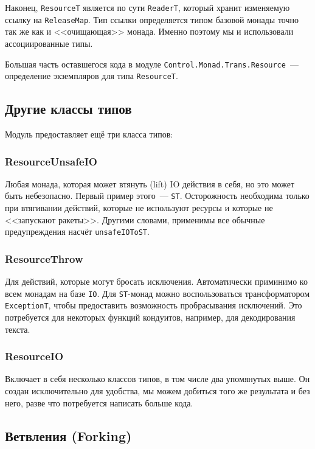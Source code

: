 Наконец, \lstinline'ResourceT' является по сути \lstinline'ReaderT', который
хранит изменяемую
ссылку на \lstinline'ReleaseMap'. Тип ссылки определяется типом базовой монады точно так же как и <<очищающая>> монада. Именно поэтому мы и использовали ассоциированные типы.

Большая часть оставшегося кода в модуле \lstinline'Control.Monad.Trans.Resource'~---
определение экземпляров для типа \lstinline'ResourceT'.

\subsection{Другие классы типов}

Модуль предоставляет ещё три класса типов:

\subsubsection{ResourceUnsafeIO}
Любая монада, которая может втянуть (lift) IO действия в себя, но это может быть небезопасно.
Первый пример этого~--- \lstinline'ST'. Осторожность необходима только при втягивании действий, которые не используют ресурсы и которые не <<запускают ракеты>>.
Другими словами, применимы все обычные предупреждения насчёт \lstinline'unsafeIOToST'.

\subsubsection{ResourceThrow}

Для действий, которые могут бросать исключения. Автоматически приминимо ко всем
монадам на базе \lstinline{IO}. Для \lstinline{ST}-монад можно воспользоваться трансформатором
\lstinline'ExceptionT', чтобы
предоставить возможность пробрасывания исключений. Это потребуется для некоторых функций
кондуитов, например, для декодирования текста.

\subsubsection{ResourceIO}

Включает в себя несколько классов типов, в том числе два
упомянутых выше. Он создан исключительно для удобства, мы можем добиться того же результата и без него,
разве что потребуется написать больше кода.

\subsection{Ветвления (Forking)}

